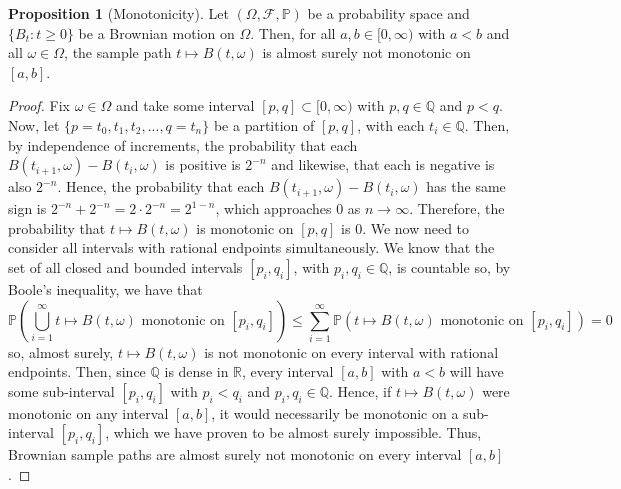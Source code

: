 \documentclass[a4paper,11pt]{article}
\theoremstyle{plain}
\theoremstyle{definition}
\newtheorem{proposition}[theorem]{Proposition}
\begin{document}
\begin{proposition}[Monotonicity]
Let $(\Omega,\mathcal{F},\mathbb{P})$ be a probability space and $\{B_t:t \geq 0\}$ be a Brownian motion on $\Omega$. Then, for all $a,b \in [0,\infty)$ with $a < b$ and all $\omega \in \Omega$, the sample path $t \mapsto B(t,\omega)$ is almost surely not monotonic on $[a,b]$.
\end{proposition}

\begin{proof}\citep[p.~18]{M&P}
Fix $\omega \in \Omega$ and take some interval $[p,q] \subset [0,\infty)$ with $p,q \in \mathbb{Q}$ and $p < q$. Now, let $\{p = t_0, t_1, t_2,..., q = t_n\}$ be a partition of $[p,q]$, with each $t_i \in \mathbb{Q}$. Then, by independence of increments, the probability that each $B(t_{i+1},\omega) - B(t_i,\omega)$ is positive is $2^{-n}$ and likewise, that each is negative is also $2^{-n}$. Hence, the probability that each $B(t_{i+1},\omega) - B(t_i,\omega)$ has the same sign is $2^{-n} + 2^{-n} = 2 \cdot 2^{-n} = 2^{1 - n}$, which approaches $0$ as $n \to \infty$. Therefore, the probability that $t \mapsto B(t,\omega)$ is monotonic on $[p,q]$ is $0$. We now need to consider all intervals with rational endpoints simultaneously. We know that the set of all closed and bounded intervals $[p_i,q_i]$, with $p_i,q_i \in \mathbb{Q}$, is countable so, by Boole's inequality, we have that
\[
\mathbb{P}\left(\bigcup_{i=1}^{\infty} t \mapsto B(t,\omega) \text{ monotonic on } [p_i,q_i]\right) \leq \sum_{i=1}^{\infty}\mathbb{P}\left(t \mapsto B(t,\omega)\text{ monotonic on } [p_i,q_i]\right) = 0
\]
so, almost surely, $t \mapsto B(t,\omega)$ is not monotonic on every interval with rational endpoints. Then, since $\mathbb{Q}$ is dense in $\mathbb{R}$, every interval $[a,b]$ with $a < b$ will have some sub-interval $[p_i,q_i]$ with $p_i < q_i$ and $p_i,q_i \in \mathbb{Q}$. Hence, if $t \mapsto B(t,\omega)$ were monotonic on any interval $[a,b]$, it would necessarily be monotonic on a sub-interval $[p_i,q_i]$, which we have proven to be almost surely impossible. Thus, Brownian sample paths are almost surely not monotonic on every interval $[a,b]$.
\end{proof}
\end{document}
